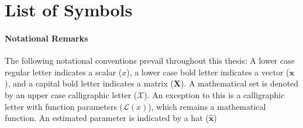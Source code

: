 \chapter*{List of Symbols}

\subsubsection*{Notational Remarks}
The following notational conventions prevail throughout this thesis: A lower case regular letter indicates a scalar ($x$), a lower case bold letter indicates a vector ($\bm x$), and a capital bold letter indicates a matrix ($\bm X$). A mathematical set is denoted by an upper case calligraphic letter ($\mathcal{X}$). An exception to this is a calligraphic letter with function parameters ($\mathcal{L}(x)$), which remains a mathematical function. An estimated parameter is indicated by a hat ($\hat{\bm x}$)




\newcommand{\prp}{\bm\phi}

\newcommand{\p}{\bm p}
\newcommand{\ps}{\p_s}
\newcommand{\psest}{\hat\p_s}
\newcommand{\pr}{\p_m^i}
\newcommand{\pall}{\mathcal{P}}
\newcommand{\pinp}{\p \in \pall}

\newcommand{\psip}{\psi_{\bm p}}
\newcommand{\psiRlast}{\bm\psi_R^{(t-1)}}
\newcommand{\psiRPlast}{\psi_{\bm p,R}^{(t-1)}}
\newcommand{\psiRnow}{\bm\psi_R^{(t)}}
\newcommand{\psiRPnow}{\psi_{\bm p,R}^{(t)}}
\newcommand{\psips}{\psi_{s\bm p}}  

\newcommand{\gaussian}[1]{\mathcal{N}\left (#1\right )}
\newcommand{\pdffunc}{\psi_{s\bm p}^{(l-1)}\prod_{m}\mathcal{N}^c\left (\phi^k_m(t,k);\tilde\phi^k_m(\bm p),\sigma_s^{2,(l-1)}\right )}
\newcommand{\pdffuncR}{\psi_{\bm p,R}^{(t-1)}\prod_{m}\mathcal{N}^c\left (\phi_m(t,k);\tilde\phi^k_m(\bm p),\sigma_R^{2,(t-1)}\right )}
\newcommand{\gauss}{\mathcal{N}^c\big(\phi_m(t,k);\tilde\phi^k_m,\sigma_s^2\big)}
\newcommand{\Q}{\mathcal{Q}\left (\theta\vert\theta^{(l-1)}\right )}
\newcommand{\mulast}{h^{(l)}(t,k,s,\bm p)}
\newcommand{\muRlast}{h(t,k,\bm p)}
\newcommand{\z}{z(t,k,s,\bm p)}
\newcommand{\lcompl}{\prod_{t,k}\sum_{s,\bm p}\psips\cdot\z\prod_{m}\gauss}

